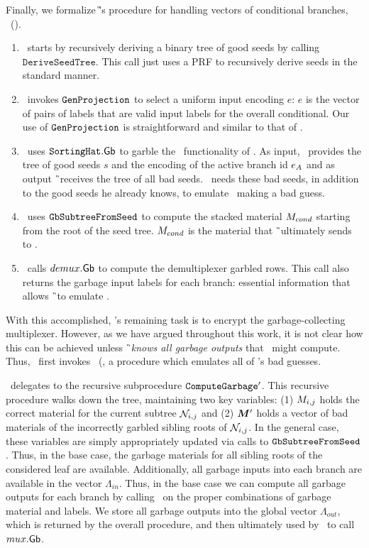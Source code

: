 Finally, we formalize \G's procedure for handling vectors of
conditional branches, \gbcond~().
%
\begin{enumerate}
  \item \gbcond\ starts by recursively deriving a binary tree of
good seeds by calling $\mathtt{DeriveSeedTree}$. This call just uses a PRF
to recursively derive seeds in the standard manner.
%
\item \gbcond\ invokes $\mathtt{GenProjection}$ to select a uniform input
encoding $e$: $e$ is the vector of pairs of labels that are
valid input labels for the overall conditional.
Our use of $\mathtt{GenProjection}$ is straightforward and similar to that of
\HK.
%
\item \gbcond\ uses $\mathtt{SortingHat}.\textsf{Gb}$ to garble the \gadget\
  functionality of .
  As input, \gbcond\ provides the tree of good seeds $s$ and the encoding
  of the active branch id $e_{A}$ and as output \G\ receives the tree
  of all bad seeds.
  \gbcond\ needs these bad seeds, in addition to the good seeds he
  already knows, to emulate \E\ making a bad guess.
%
\item \gbcond\ uses $\mathtt{GbSubtreeFromSeed}$ to compute the stacked material
$M_{cond}$ starting from the root of the seed tree.
$M_{cond}$ is the material that \G\ ultimately sends to \E.
%
\item \gbcond\ calls $demux.\textsf{Gb}$ to compute the demultiplexer garbled
  rows.  This call also returns the garbage input labels for each
  branch: essential information that allows \G\ to emulate \E.
\end{enumerate}
With this accomplished, \gbcond's remaining task is to encrypt the
garbage-collecting multiplexer.
However, as we have argued throughout this work, it is not clear how
this can be achieved unless \G\ \emph{knows all garbage outputs} that
\E\ might compute.
%
Thus, \gbcond\ first invokes \computegarbage\
(, a procedure which
emulates all of \E's bad guesses.

\computegarbage\ delegates to the recursive subprocedure
$\mathtt{ComputeGarbage}'$. This recursive procedure walks down the tree,
maintaining two key variables: (1) $M_{i,j}$ holds the correct
material for the current subtree $\mathtt{\cal N}_{i,j}$ and (2) $\vec{\mat}'$
holds a vector of bad materials of the incorrectly garbled sibling
roots of $\mathtt{\cal N}_{i,j}$.
%
In the general case, these variables are simply appropriately updated
via calls to $\mathtt{GbSubtreeFromSeed}$.
Thus,
in the base case, the garbage materials for all sibling roots of the
considered leaf are available.
Additionally, all garbage inputs into each branch are available in the
vector $\Lambda_{in}$.
%
Thus, in the base case we can compute all garbage outputs for each
branch by calling \gEv\ on the proper combinations of garbage material
and labels.
%
We store all garbage outputs into the global vector $\Lambda_{out}$, which is
returned by the overall procedure, and then ultimately used by
\gbcond\ to call $mux.\textsf{Gb}$.

